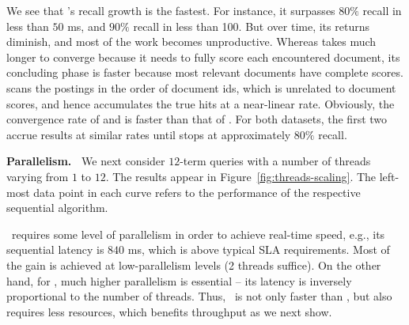 {We see that \alg's recall growth is the fastest. For instance, it surpasses $80\%$ recall in less than $50$ ms, 
and $90\%$ recall in less than 100. But over time, its returns  diminish, and most of the work becomes unproductive. Whereas
\pRA\/ takes much longer to converge because it needs to fully score each encountered document,  its concluding phase is faster because 
most relevant documents   have complete  scores. 
\pBMW\/ scans the postings in the order of document ids, which is unrelated to document scores, and hence accumulates the true hits 
at a near-linear rate. Obviously, the convergence rate of \pBMW\hi\/ and \pBMW\lo\/ is faster than that of \pBMW\ex. For both datasets, the first 
two accrue results at similar rates until \pBMW\lo\/ stops at approximately $80\%$ recall. 

{\bf Parallelism.\ } 
We next consider  $12$-term queries with a number of threads varying from $1$ to $12$. 
The results appear in Figure~\ref{fig:threads-scaling}.  
The left-most data point in each curve refers to the performance of 
the respective sequential algorithm.

\alg\ requires some level of parallelism in order to achieve real-time speed, e.g., its sequential
latency 
is $840$ ms, which is  above typical SLA requirements. Most of the gain is achieved at low-parallelism levels (2 threads suffice). 
On the other hand, for \pBMW, much higher parallelism is essential -- its latency is inversely proportional to the number of threads. Thus, \alg\ is not only faster 
than \pBMW, but also requires less resources, which benefits throughput as we next show.

}
